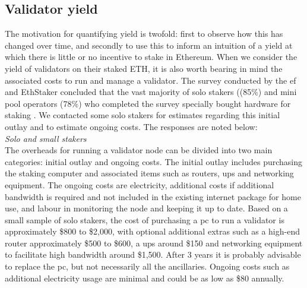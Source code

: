 \documentclass[UTF8]{article}
\begin{document}
\subsection{Validator yield}
\label{yield}
The motivation for quantifying yield is twofold: first to observe how this has changed over time, and secondly to use this to inform an intuition of a yield at which there is little or no incentive to stake in Ethereum.
When we consider the yield of validators on their staked ETH, it is also worth bearing in mind the associated costs to run and manage a validator. 
The survey conducted by the \gls{ef} and EthStaker concluded that the vast majority of solo stakers ((85\%) and mini pool operators (78\%) who completed the survey specially bought hardware for staking \cite{Smith2023}. We contacted some solo stakers for estimates regarding this initial outlay and to estimate ongoing costs. The responses are noted below: \\
\noindent
\textit{Solo and small stakers} \\
The overheads for running a validator node can be divided into two main categories: initial outlay and ongoing costs. The initial outlay includes purchasing the staking computer and associated  items such as routers, \gls{ups} and networking equipment. The ongoing costs are electricity, additional costs if additional bandwidth is required and not included in the existing internet package for home use, and labour in monitoring the node and keeping it up to date. Based on a small sample of solo stakers, the cost of purchasing a \gls{pc} to run a validator is approximately \$800 to \$2,000, with optional additional extras such as a high-end router approximately \$500 to \$600, a \gls{ups} around \$150 and networking equipment to facilitate high bandwidth around \$1,500. After 3 years it is probably advisable to replace the \gls{pc}, but not necessarily all the ancillaries. Ongoing costs such as additional electricity usage are minimal and could be as low as \$80 annually. 
\end{document}
